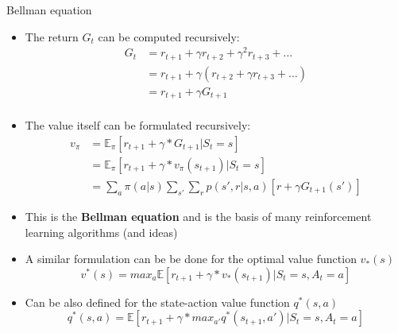 \documentclass[presentation, 9pt]{beamer}\mode<presentation>{\usetheme{AMSBolognaFC}}
\begin{document}
\begin{frame}{Bellman equation}
	\begin{itemize}
		\item The return $G_t$ can be computed recursively:
		\begin{equation*}
			\begin{split}
				G_t & = r_{t+1} + \gamma r_{t+2} + \gamma^2 r_{t+3} + \dots \\
				& = r_{t+1} + \gamma (r_{t+2} + \gamma r_{t+3} + \dots) \\
				& = r_{t+1} + \gamma G_{t+1} \\
			\end{split}
		\end{equation*}
		\item The value itself can be formulated recursively: 
		\begin{equation*}
			\begin{split}
			v_{\pi} & = \mathbb{E}_{\pi} [r_{t+1} + \gamma * G_{t+1} | S_t = s] \\
			& = \mathbb{E}_{\pi} [r_{t+1} + \gamma * v_{\pi}(s_{t+1}) | S_t = s] \\
			& = \sum_a \pi(a|s) \sum_{s'} \sum_r p(s', r | s, a) [r + \gamma G_{t+1}(s')]
			\end{split}
		\end{equation*}
		\item This is the \textbf{Bellman equation} and is the basis of many reinforcement learning algorithms (and ideas)
		\item A similar formulation can be be done for the optimal value function $v_*(s)$
		\begin{equation*}
			v^*(s) = max_a \mathbb{E} [r_{t+1} + \gamma * v_*(s_{t+1}) | S_t = s, A_t = a]
		\end{equation*}
		\item Can be also defined for the state-action value function $q^*(s,a)$
		\begin{equation*}
			q^*(s, a) = \mathbb{E} [r_{t+1} + \gamma * max_{a'} q^*(s_{t+1}, a') | S_t = s, A_t = a]
		\end{equation*}
	\end{itemize}
\end{frame}
\end{document}
